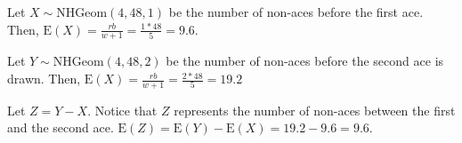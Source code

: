 Let $X \sim \text{NHGeom}(4,48,1)$ be the number of non-aces before the
first ace. Then, $\text{E}(X) = \frac{rb}{w+1} = \frac{1*48}{5} = 9.6$.

Let $Y \sim \text{NHGeom}(4, 48, 2)$ be the number of non-aces before the second
ace is drawn. Then, $\text{E}(X) = \frac{rb}{w+1} = \frac{2*48}{5} = 19.2$

Let $Z = Y - X$. Notice that $Z$ represents the number of non-aces between the
first and the second ace. $\text{E}(Z) = \text{E}(Y) - \text{E}(X) = 19.2 - 9.6 =
9.6$.
